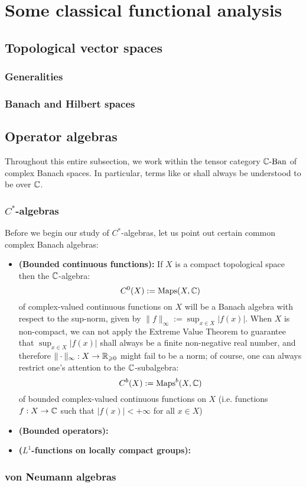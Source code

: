 \section{Some classical functional analysis}
    \subsection{Topological vector spaces}
        \subsubsection{Generalities}

        \subsubsection{Banach and Hilbert spaces}

    \subsection{Operator algebras}
        \begin{convention}
            Throughout this entire subsection, we work within the tensor category $\mathbb{C}\text{-}\mathrm{Ban}$ of complex Banach spaces. In particular, terms like  or  shall always be understood to be over $\mathbb{C}$. 
        \end{convention}
        
        \subsubsection{\texorpdfstring{$C^*$}{}-algebras}
            \begin{example}
                Before we begin our study of $C^*$-algebras, let us point out certain common complex Banach algebras:
                    \begin{itemize}
                        \item \textbf{(Bounded continuous functions):} If $X$ is a compact topological space then the $\mathbb{C}$-algebra:
                            $$C^0(X) := \mathrm{Maps}(X, \mathbb{C})$$
                        of complex-valued continuous functions on $X$ will be a Banach algebra with respect to the sup-norm, given by $\|f\|_{\infty} := \sup_{x \in X} |f(x)|$. When $X$ is non-compact, we can not apply the Extreme Value Theorem to guarantee that $\sup_{x \in X} |f(x)|$ shall always be a finite non-negative real number, and therefore $\|\cdot\|_{\infty}: X \to \mathbb{R}_{\geqslant 0}$ might fail to be a norm; of course, one can always restrict one's attention to the $\mathbb{C}$-subalgebra:
                            $$C^b(X) := \mathrm{Maps}^b(X, \mathbb{C})$$
                        of bounded complex-valued continuous functions on $X$ (i.e. functions $f: X \to \mathbb{C}$ such that $|f(x)| < +\infty$ for all $x \in X$) 
                        \item \textbf{(Bounded operators):}
                        \item \textbf{($L^1$-functions on locally compact groups):}
                    \end{itemize}
            \end{example}
        
        \subsubsection{von Neumann algebras}